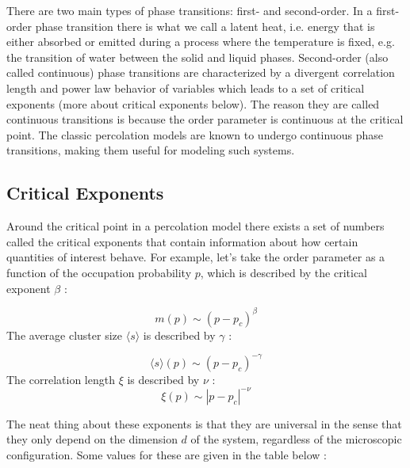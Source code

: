 There are two main types of phase transitions: first- and second-order.
In a first-order phase transition there is what we call a latent heat, i.e. energy that is either absorbed or emitted during a process where the temperature is fixed, e.g. the transition of water between the solid and liquid phases.
Second-order (also called continuous) phase transitions are characterized by a divergent correlation length and power law behavior of variables which leads to a set of critical exponents (more about critical exponents below).
The reason they are called continuous transitions is because the order parameter is continuous at the critical point.
The classic percolation models are known to undergo continuous phase transitions, making them useful for modeling such systems.



\subsection{Critical Exponents}
Around the critical point in a percolation model there exists a set of numbers called the critical exponents that contain information about how certain quantities of interest behave.
For example, let's take the order parameter as a function of the occupation probability $p$, which is described by the critical exponent $\beta$ \cite{intro_to_percolation_theory}:

\begin{equation}
	\label{eqn:crit_exp_P}
	m(p) \sim (p - p_c)^\beta
\end{equation}
The average cluster size $\langle s \rangle$ is described by $\gamma$ \cite{intro_to_percolation_theory}:

\begin{equation}
	\label{eqn:crit_exp_s}
	\langle s \rangle (p) \sim (p - p_c)^{-\gamma}
\end{equation}
The correlation length $\xi$ is described by $\nu$ \cite{intro_to_percolation_theory}:
\begin{equation}
	\label{eqn:crit_exp_xi}
	\xi (p) \sim |p - p_c|^{-\nu}
\end{equation}

The neat thing about these exponents is that they are universal in the sense that they only depend on the dimension $d$ of the system, regardless of the microscopic configuration.
Some values for these are given in the table below \cite{intro_to_percolation_theory}:

